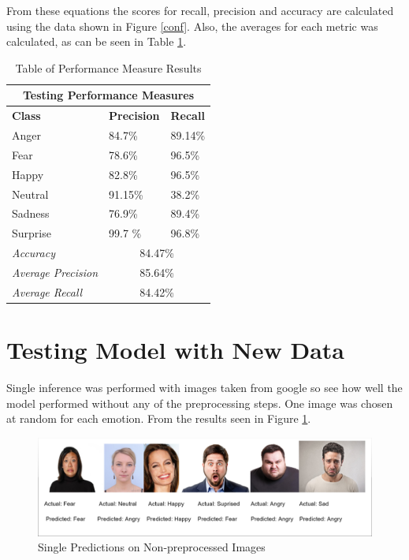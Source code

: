 From these equations the scores for recall, precision and accuracy are calculated using the data shown in Figure \ref{conf}. Also, the averages for each metric was calculated, as can be seen in Table \ref{table:per}.
\begin{table}[ht]
	\begin{center}
	\begin{tabular}{|p{5cm}||p{2cm}||p{2cm}|}		
		\hline
		
		\multicolumn{3}{|c|}{Testing Performance Measures} \\
		\hline
		\textbf{Class}& \textbf{Precision} &  \textbf{Recall}\\
		\hline
		Anger  & 84.7\% & 89.14\%	\\
		\hline
		Fear  & 78.6\% & 96.5\%	\\
		\hline
		Happy  & 82.8\% & 96.5\%  \\
		\hline
		Neutral & 91.15\% & 38.2\%	\\
		\hline	
		Sadness &  76.9\% & 89.4\%	\\
		\hline
		Surprise & 99.7 \% & 96.8\%	\\
		\hline	
		\hline 
		\textit{Accuracy} & \multicolumn{2}{|c|}{ 84.47\%} \\
		\hline
		\textit{Average Precision} & \multicolumn{2}{|c|}{ 85.64\%} \\
		\hline
		\textit{Average Recall} & \multicolumn{2}{|c|}{ 84.42\%} \\
		\hline
	\end{tabular}
	\caption{Table of Performance Measure Results}
	\label{table:per}
	\end{center}
\end{table}
	
\section{Testing Model with New Data}
Single inference was performed with images taken from google so see how well the model performed without any of the preprocessing steps. One image was chosen at random for each emotion. From the results seen in Figure \ref{inf}.

\begin{figure}[ht]
	\begin{center}
		\advance\leftskip-3cm
		\advance\rightskip-3cm
		\includegraphics[keepaspectratio=true,scale=0.25]{__resources/Testing/inference.png}
		\caption{Single Predictions on Non-preprocessed Images}
		\label{inf}
	\end{center}
\end{figure}


